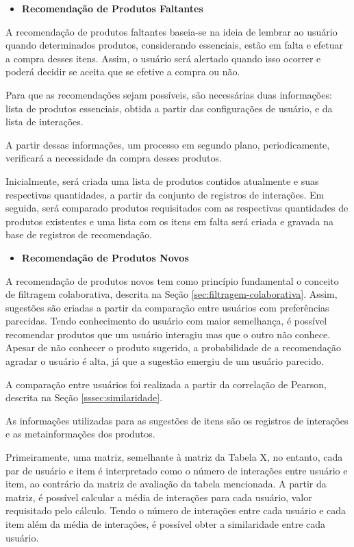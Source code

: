 \begin{itemize}
    \item \textbf{Recomendação de Produtos Faltantes}
\end{itemize}

A recomendação de produtos faltantes baseia-se na ideia de lembrar ao usuário quando determinados produtos, considerando essenciais, estão em falta e efetuar a compra desses itens. Assim, o usuário será alertado quando isso ocorrer e poderá decidir se aceita que se efetive a compra ou não.

Para que as recomendações sejam possíveis, são necessárias duas informações: lista de produtos essenciais, obtida a partir das configurações de usuário, e da lista de interações. 

A partir dessas informações, um processo em segundo plano, periodicamente, verificará a necessidade da compra desses produtos.

Inicialmente, será criada uma lista de produtos contidos atualmente e suas respectivas quantidades, a partir da conjunto de registros de interações. Em seguida, será comparado produtos requisitados com as respectivas quantidades de produtos existentes e uma lista com os itens em falta será criada e gravada na base de registros de recomendação.

\begin{itemize}
    \item \textbf{Recomendação de Produtos Novos}
\end{itemize}

A recomendação de produtos novos tem como princípio fundamental o conceito de filtragem colaborativa, descrita na Seção \ref{sec:filtragem-colaborativa}. Assim, sugestões são criadas a partir da comparação entre usuários com preferências parecidas. Tendo conhecimento do usuário com maior semelhança, é possível recomendar produtos que um usuário interagiu mas que o outro não conhece. Apesar de não conhecer o produto sugerido, a probabilidade de a recomendação agradar o usuário é alta, já que a sugestão emergiu de um usuário parecido.

A comparação entre usuários foi realizada a partir da correlação de Pearson, descrita na Seção \ref{sssec:similaridade}.

As informações utilizadas para as sugestões de itens são os registros de interações e as metainformações dos produtos. 

Primeiramente, uma matriz, semelhante à matriz da Tabela X, no entanto, cada par de usuário e item é interpretado como o número de interações entre usuário e item, ao contrário da matriz de avaliação da tabela mencionada. A partir da matriz, é possível calcular a média de interações para cada usuário, valor requisitado pelo cálculo. Tendo o número de interações entre cada usuário e cada item além da média de interações, é possível obter a similaridade entre cada usuário.

